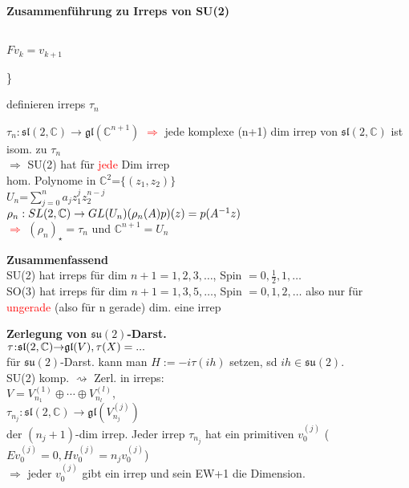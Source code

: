 \documentclass[8pt, a4paper, landscape]{extarticle}
\newcommand{\tit}[1]{\textbf{#1} \\}
\newcommand{\C}{\mathbb{C}}
\newcommand{\hi}[1]{\textcolor{Cerulean}{#1}}
\newcommand{\re}[1]{\textcolor{red}{#1}}
\newcommand{\eck}[1]{\mathfrak{#1}}
\begin{document}
\begin{multicols*}{5}
\begin{ibox}
    \tit{Zusammenführung zu Irreps von SU(2)}
    \begin{minipage}{0.5\linewidth}
        \\
        $Fv_k=v_{k+1}$
    \end{minipage}
    \bigg\}
    \begin{minipage}{0.4\linewidth}
        definieren irreps $\tau_n$
    \end{minipage}
    $\tau_n:\eck{sl}(2,\mathbb{C})\rightarrow\eck{gl}(\mathbb{C}^{n+1})$
    \textcolor{red}{$\Rightarrow$} jede komplexe (n+1) dim irrep von $\eck{sl}(2,\mathbb{C})$ ist isom. zu $\tau_n$\\
    $\Rightarrow$ SU(2) hat für \re{jede} Dim irrep\\
    \hi{hom. Polynome in $\mathbb{C}^2$=$\{(z_1,z_2)\}$}\\
    $U_n$=$\sum_{j=0}^na_jz_1^jz_2^{n-j}$\\
    $\rho_n:SL(2,\mathbb{C})\rightarrow GL(U_n)\\ (\rho_n(A)p)(z)=p(A^{-1}z)$\\
    \textbf{\textcolor{red}{{$\Rightarrow$}}} $(\rho_n)_\star=\tau_n$ und $\mathbb{C}^{n+1}=U_n$
\end{ibox}

\begin{ibox}
    \tit{Zusammenfassend}
    SU(2) hat irreps für dim $n+1=1,2,3,\dots$, Spin $=0,\frac{1}{2},1,\dots$\\
    SO(3) hat irreps für dim $n+1=1,3,5,\dots$, Spin $=0,1,2,\dots$ also  nur für \re{ungerade} (also für n gerade) dim. eine irrep\\
\end{ibox}
\begin{ibox}
    \tit{Zerlegung von $\eck{su}(2)$-Darst.}
    $\tau\negmedspace:\negmedspace\eck{sl}(2,\C)\negthickspace\rightarrow\negthickspace\eck{gl}(V), \tau(X) = ...$\\
    
    für $\eck{su}(2)$-Darst. kann man $H:=-i\tau(ih)$ setzen, sd $ih\in\eck{su}(2)$.\\
    
    SU(2) komp. $\rightsquigarrow$ Zerl. in irreps:\\
    $V=V_{n_1}^{(1)}\oplus\cdots\oplus V_{n_l}^{(l)}$,\\ $\tau_{n_j}:\eck{sl}(2,\C)\rightarrow\eck{gl}(V_{n_j}^{(j)})$ \\der $(n_j+1)$-dim irrep.
    Jeder irrep $\tau_{n_j}$ hat ein primitiven $v_0^{(j)}$
    ($Ev_0^{(j)}=0, Hv_0^{(j)}= n_jv_0^{(j)}$)\\ 
    $\Rightarrow$ jeder $v_0^{(j)}$ gibt ein irrep und sein EW+1 die Dimension.
    

\end{ibox}
\end{multicols*}
\end{document}
